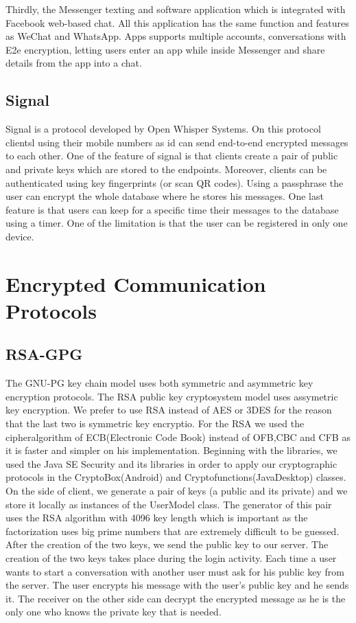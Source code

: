 \documentclass[11pt,a4paper]{report}
\begin{document}
Thirdly, the Messenger texting and software application which is integrated with Facebook web-based chat. All this application has the same function and features as WeChat and WhatsApp.  Apps supports multiple accounts, conversations with E2e encryption, letting users enter an app while inside Messenger and share details from the app into a chat.

\subsection{Signal}
Signal is a protocol developed by Open Whisper Systems. On this protocol clientsl using their mobile numbers as id can send end-to-end encrypted messages to each other. One of the feature of signal is that clients create a pair of public and private keys which are stored to the endpoints. Moreover, clients can be authenticated using key fingerprints (or scan QR codes). Using a passphrase the user can encrypt the whole database where he stores his messages. One last feature is that users can keep for a specific time their messages to the database using a timer. One of the limitation is that the user can be registered in only one device.

\section{Encrypted Communication Protocols}

\subsection{RSA-GPG}
The GNU-PG key chain model uses both symmetric and asymmetric key encryption protocols. The RSA public key cryptosystem model uses assymetric key encryption. We prefer to use RSA instead of AES or 3DES for the reason that the last two is symmetric key encryptio. For the RSA we used the cipheralgorithm of ECB(Electronic Code Book) instead of OFB,CBC and CFB as it is faster and simpler on his implementation. Beginning with the libraries, we used the Java SE Security and its libraries in order to apply our cryptographic protocols in the CryptoBox(Android) and Cryptofunctions(JavaDesktop) classes. On the side of client, we generate a pair of keys (a public and its private) and we store it locally as instances of the UserModel class. The generator of this pair uses the RSA algorithm with 4096 key length which is important as the factorization uses big prime numbers that are extremely difficult to be guessed. After the creation of the two keys, we send the public key to our server. The creation of the two keys takes place during the login activity. Each time a user wants to start a conversation with another user must ask for his public key from the server. The user encrypts his message with the user’s public key and he sends it. The receiver on the other side can decrypt the encrypted message as he is the only one who knows the private key that is needed.
\end{document}
